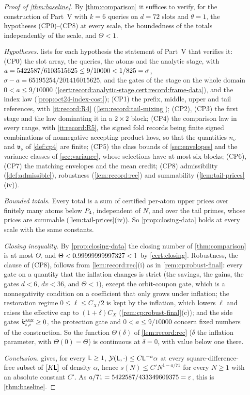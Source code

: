 \begin{proof}[Proof of \cref{thm:baseline}]
By \cref{thm:comparison} it suffices to verify, for the construction of
Part~V with $k=6$ queries on $d=72$ slots and $\theta=1$, the hypotheses
(CP0)--(CP8) at every scale, the boundedness of the totals independently of
the scale, and $\Theta<1$.

\emph{Hypotheses.}  lists for each hypothesis the
statement of Part~V that verifies it: (CP0) the slot array, the queries,
the atoms and the analytic stage, with
$a=5422587/6103515625\le9/10000<1/825=\sigma$,
$\sigma-a=65195254/201416015625$, and the gates of the stage on the whole
domain $0<a\le9/10000$
(\cref{cert:record:analytic-stage,cert:record:frame-data}), and the index law
(\cref{prop:oct24-index-cost}); (CP1) the prefix, middle, upper and tail
references, with \ref{it:record:R4} (\cref{lem:record:tail-mixing}); (CP2),
(CP3) the first stage and the law dominating it in a $2\times2$ block;
(CP4) the comparison law in every range, with \ref{it:record:R5}, the signed
fold records being finite signed combinations of nonnegative accepting
product laws, so that the quantities $n_\nu$ and $\mathfrak v_\nu$ of \cref{def:cp4} are finite; (CP5) the
class bounds of \cref{sec:envelopes} and the variance classes of
\cref{sec:variance}, whose selections have at most six blocks;
(CP6), (CP7) the matching
envelopes and the mean credit; (CP8) admissibility (\cref{def:admissible}),
robustness (\cref{lem:record:rec}) and summability (\cref{lem:tail-prices}(iv)).

\emph{Bounded totals.} Every total is a sum of certified per-atom upper
prices over finitely many atoms below $P_4$, independent of $N$, and over
the tail primes, whose prices are summable (\cref{lem:tail-prices}(iv)). So
\cref{prop:closing-data} holds at every scale with the same constants.

\emph{Closing inequality.} By \cref{prop:closing-data} the closing number of
\cref{thm:comparison} is at most $\Theta$, and $\Theta<0.99999999997327<1$ by
\cref{cert:closing}. Robustness, the clause of (CP8), follows from
\cref{lem:record:rec}(i) as in \cref{rem:cp:robust-final}: every gate on a
quantity that the inflation changes is strict (the savings, the gains, the
gates $d<6$, $dv<36$, and $\Theta<1$), except the orbit-coupon gate, which is a
nonnegativity condition on a coefficient that only grows under inflation; the
restoration regime $0\le\ell\le C_X/2$ is kept by the inflation, which lowers $\ell$ and raises the effective cap to $(1+\delta)C_X$ (\cref{rem:cp:robust-final}(c)); and the side gates $k^{\rm aux}_{s,i}\ge0$, the
protection gate and $0<a\le9/10000$ concern fixed numbers of the construction.
So the function $\Theta(\delta)$ of \cref{lem:record:rec}
($\delta$ the inflation parameter, with $\Theta(0)=\Theta$) is
continuous at $\delta=0$, with value below one there.

\emph{Conclusion.}  gives, for every $\mathsf L\ge1$,
$\mathcal Y(\mathsf L,\cdot)\le C\mathsf L^{-a}\alpha$ at every square-difference-free subset
of $[K\mathsf L]$ of density $\alpha$, hence
$s(N)\le C'N^{1-a/71}$ for every $N\ge1$ with an absolute constant $C'$. As
$a/71=5422587/433349609375=\varepsilon$, this is \cref{thm:baseline}.
\end{proof}

